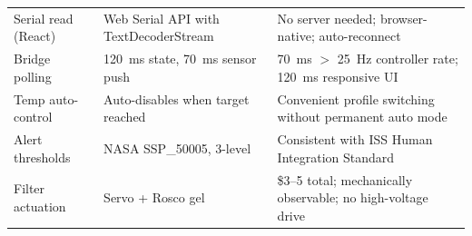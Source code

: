 \documentclass[12pt,letterpaper]{article}
\begin{document}
\begin{longtable}{p{3.5cm}p{5.5cm}p{5cm}}
  Serial read (React) &
    Web Serial API with TextDecoderStream &
    No server needed; browser-native; auto-reconnect \\
  \addlinespace

  Bridge polling &
    120~ms state, 70~ms sensor push &
    70~ms $>$ 25~Hz controller rate; 120~ms responsive UI \\
  \addlinespace

  Temp auto-control &
    Auto-disables when target reached &
    Convenient profile switching without permanent auto mode \\
  \addlinespace

  Alert thresholds &
    NASA SSP\_50005, 3-level &
    Consistent with ISS Human Integration Standard \\
  \addlinespace

  Filter actuation &
    Servo + Rosco gel &
    \$3--5 total; mechanically observable; no high-voltage drive \\

\end{longtable}
\end{document}

